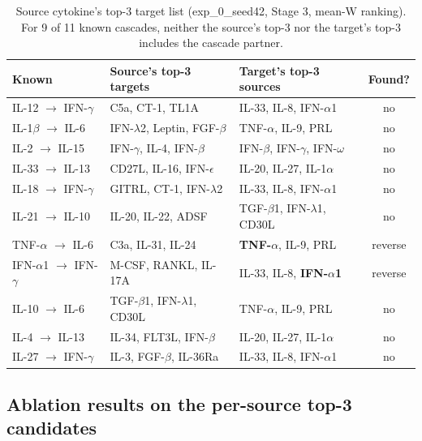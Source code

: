\documentclass[11pt,a4paper]{article}
\begin{document}
\begin{table}[h]
\centering
\caption{Source cytokine's top-3 target list (exp\_0\_seed42, Stage 3,
mean-W ranking). For 9 of 11 known cascades, neither the source's
top-3 nor the target's top-3 includes the cascade partner.}
\label{tab:per-source-rank}
\footnotesize
\begin{tabular}{lll c}
\toprule
\textbf{Known} & \textbf{Source's top-3 targets} & \textbf{Target's top-3 sources} & \textbf{Found?} \\
\midrule
IL-12 $\to$ IFN-$\gamma$    & C5a, CT-1, TL1A             & IL-33, IL-8, IFN-$\alpha$1 & {\color{red}no} \\
IL-1$\beta$ $\to$ IL-6       & IFN-$\lambda$2, Leptin, FGF-$\beta$ & TNF-$\alpha$, IL-9, PRL    & {\color{red}no} \\
IL-2 $\to$ IL-15             & IFN-$\gamma$, IL-4, IFN-$\beta$ & IFN-$\beta$, IFN-$\gamma$, IFN-$\omega$ & {\color{red}no} \\
IL-33 $\to$ IL-13            & CD27L, IL-16, IFN-$\epsilon$ & IL-20, IL-27, IL-1$\alpha$ & {\color{red}no} \\
IL-18 $\to$ IFN-$\gamma$     & GITRL, CT-1, IFN-$\lambda$2 & IL-33, IL-8, IFN-$\alpha$1 & {\color{red}no} \\
IL-21 $\to$ IL-10            & IL-20, IL-22, ADSF          & TGF-$\beta$1, IFN-$\lambda$1, CD30L & {\color{red}no} \\
TNF-$\alpha$ $\to$ IL-6      & C3a, IL-31, IL-24           & \textbf{TNF-$\alpha$}, IL-9, PRL & {\color{green!50!black}reverse} \\
IFN-$\alpha$1 $\to$ IFN-$\gamma$ & M-CSF, RANKL, IL-17A    & IL-33, IL-8, \textbf{IFN-$\alpha$1} & {\color{green!50!black}reverse} \\
IL-10 $\to$ IL-6             & TGF-$\beta$1, IFN-$\lambda$1, CD30L & TNF-$\alpha$, IL-9, PRL & {\color{red}no} \\
IL-4 $\to$ IL-13             & IL-34, FLT3L, IFN-$\beta$   & IL-20, IL-27, IL-1$\alpha$ & {\color{red}no} \\
IL-27 $\to$ IFN-$\gamma$     & IL-3, FGF-$\beta$, IL-36Ra  & IL-33, IL-8, IFN-$\alpha$1 & {\color{red}no} \\
\bottomrule
\end{tabular}
\end{table}

\subsection{Ablation results on the per-source top-3 candidates}
\end{document}
